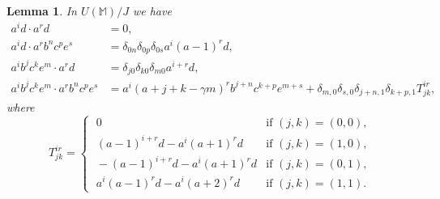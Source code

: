 \documentclass{amsart}
\theoremstyle{plain}
\newtheorem{lemma}{Lemma}[section]
\theoremstyle{definition}
\begin{document}
\begin{lemma} \label{multiplicationtable}
In $U(\mathbb{M})/J$ we have
  \allowdisplaybreaks
  \begin{align*}
  a^i d \cdot a^r d
  &=
  0,
  \\
  a^i d \cdot a^r b^n c^p e^s
  &=
  \delta_{0n} \delta_{0p} \delta_{0s} a^i (a{-}1)^r d,
  \\
  a^i b^j c^k e^m \cdot a^r d
  &=
  \delta_{j0} \delta_{k0} \delta_{m0} a^{i+r} d,
  \\
  a^i b^j c^k e^m \cdot a^r b^n c^p e^s
  &=
  a^i (a{+}j{+}k{-}\gamma m)^r b^{j+n} c^{k+p} e^{m+s}
  +
  \delta_{m,0} \delta_{s,0} \delta_{j+n, 1}\delta_{k+p,1} T^{i r}_{jk},
  \end{align*}
where
  \[
  T^{ir}_{jk} =
  \begin{cases}
  \;
  0
  &\text{if $(j,k)=(0,0)$},
  \\
  \;
  (a-1)^{i+r} d - a^i (a+1)^r d
  &\text{if $(j,k)=(1,0)$},
  \\
  \;
  - (a-1)^{i+r} d - a^i (a+1)^r d
  &\text{if $(j,k)=(0,1)$},
  \\
  \;
  a^i (a-1)^r d - a^i (a+2)^r d
  &\text{if $(j,k)= (1,1)$}.
  \end{cases}
  \]
\end{lemma}
\end{document}
